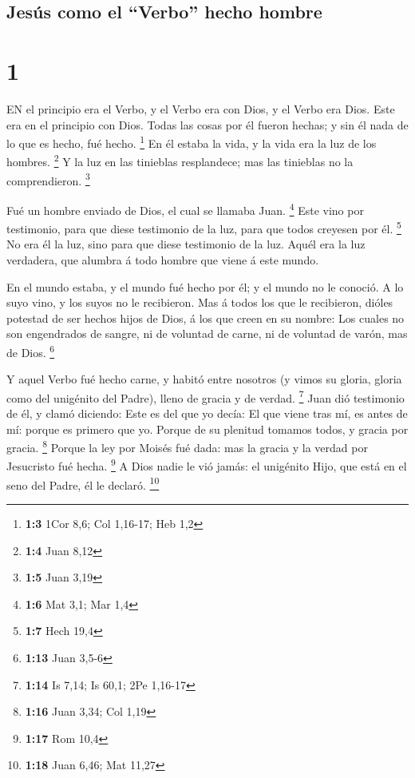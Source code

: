 \hypertarget{jesuxfas-como-el-verbo-hecho-hombre}{%
\subsection{Jesús como el ``Verbo'' hecho
hombre}\label{jesuxfas-como-el-verbo-hecho-hombre}}

\hypertarget{section}{%
\section{1}\label{section}}

 EN el principio era el Verbo, y el Verbo era con Dios, y el
Verbo era Dios.  Este era en el principio con Dios.
 Todas las cosas por él fueron hechas; y sin él nada de lo
que es hecho, fué hecho. \footnote{\textbf{1:3} 1Cor 8,6; Col 1,16-17;
  Heb 1,2}  En él estaba la vida, y la vida era la luz de
los hombres. \footnote{\textbf{1:4} Juan 8,12}  Y la luz en
las tinieblas resplandece; mas las tinieblas no la comprendieron.
\footnote{\textbf{1:5} Juan 3,19}

 Fué un hombre enviado de Dios, el cual se llamaba Juan.
\footnote{\textbf{1:6} Mat 3,1; Mar 1,4}  Este vino por
testimonio, para que diese testimonio de la luz, para que todos creyesen
por él. \footnote{\textbf{1:7} Hech 19,4}  No era él la luz,
sino para que diese testimonio de la luz.  Aquél era la luz
verdadera, que alumbra á todo hombre que viene á este mundo.

 En el mundo estaba, y el mundo fué hecho por él; y el
mundo no le conoció.  A lo suyo vino, y los suyos no le
recibieron.  Mas á todos los que le recibieron, dióles
potestad de ser hechos hijos de Dios, á los que creen en su nombre:
 Los cuales no son engendrados de sangre, ni de voluntad de
carne, ni de voluntad de varón, mas de Dios. \footnote{\textbf{1:13}
  Juan 3,5-6}

 Y aquel Verbo fué hecho carne, y habitó entre nosotros (y
vimos su gloria, gloria como del unigénito del Padre), lleno de gracia y
de verdad. \footnote{\textbf{1:14} Is 7,14; Is 60,1; 2Pe 1,16-17}
 Juan dió testimonio de él, y clamó diciendo: Este es del
que yo decía: El que viene tras mí, es antes de mí: porque es primero
que yo.  Porque de su plenitud tomamos todos, y gracia por
gracia. \footnote{\textbf{1:16} Juan 3,34; Col 1,19} 
Porque la ley por Moisés fué dada: mas la gracia y la verdad por
Jesucristo fué hecha. \footnote{\textbf{1:17} Rom 10,4}  A
Dios nadie le vió jamás: el unigénito Hijo, que está en el seno del
Padre, él le declaró. \footnote{\textbf{1:18} Juan 6,46; Mat 11,27}

